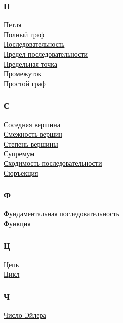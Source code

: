 \begin{multicols}{3}
\subsubsection*{П} \noindent
\hyperlink{def:loop}{Петля} \\
\hyperlink{def:complete_graph}{Полный граф} \\
\hyperlink{def:sequence}{Последовательность} \\
\hyperlink{def:limit_of_sequence}{Предел последовательности} \\
\hyperlink{def:limit_point}{Предельная точка} \\
\hyperlink{def:interval}{Промежуток} \\
\hyperlink{def:simple_graph}{Простой граф}
\subsubsection*{С} \noindent
\hyperlink{def:adjacency_of_vertexes}{Соседняя вершина} \\
\hyperlink{def:adjacency_of_vertexes}{Смежность вершин} \\
\hyperlink{def:degree_of_vertex}{Степень вершины} \\
\hyperlink{def:supremum}{Супремум} \\
\hyperlink{def:convergence_of_sequence}{Сходимость последовательности} \\
\hyperlink{def:surjection}{Сюръекция}
\subsubsection*{Ф} \noindent
\hyperlink{def:fundamental_sequence}{Фундаментальная последовательность} \\
\hyperlink{def:function}{Функция}
\subsubsection*{Ц} \noindent
\hyperlink{def:trail}{Цепь} \\
\hyperlink{def:cycle}{Цикл}
\subsubsection*{Ч} \noindent
\hyperlink{def:Euler's_number}{Число Эйлера}
\end{multicols}